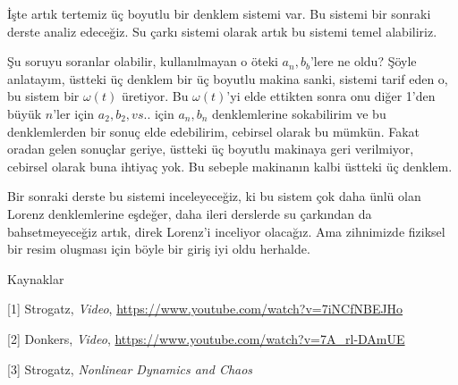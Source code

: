 \documentclass[12pt,fleqn]{article}\usepackage{../../common}
\begin{document}
İşte artık tertemiz üç boyutlu bir denklem sistemi var. Bu sistemi bir
sonraki derste analiz edeceğiz. Su çarkı sistemi olarak artık bu sistemi
temel alabiliriz. 

Şu soruyu soranlar olabilir, kullanılmayan o öteki $a_n,b_b$'lere ne oldu?
Şöyle anlatayım, üstteki üç denklem bir üç boyutlu makina sanki, sistemi
tarif eden o, bu sistem bir $\omega(t)$ üretiyor. Bu $\omega(t)$'yi elde
ettikten sonra onu diğer 1'den büyük $n$'ler için $a_2,b_2,vs..$ için
$a_n,b_n$ denklemlerine sokabilirim ve bu denklemlerden bir sonuç elde
edebilirim, cebirsel olarak bu mümkün. Fakat oradan gelen sonuçlar geriye,
üstteki üç boyutlu makinaya geri verilmiyor, cebirsel olarak buna ihtiyaç
yok. Bu sebeple makinanın kalbi üstteki üç denklem.

Bir sonraki derste bu sistemi inceleyeceğiz, ki bu sistem çok daha ünlü
olan Lorenz denklemlerine eşdeğer, daha ileri derslerde su çarkından da
bahsetmeyeceğiz artık, direk Lorenz'i inceliyor olacağız. Ama zihnimizde
fiziksel bir resim oluşması için böyle bir giriş iyi oldu herhalde.

Kaynaklar

[1] Strogatz, {\em Video}, \url{https://www.youtube.com/watch?v=7iNCfNBEJHo}

[2] Donkers, {\em Video}, \url{https://www.youtube.com/watch?v=7A_rl-DAmUE}

[3] Strogatz, {\em Nonlinear Dynamics and Chaos}
\end{document}
